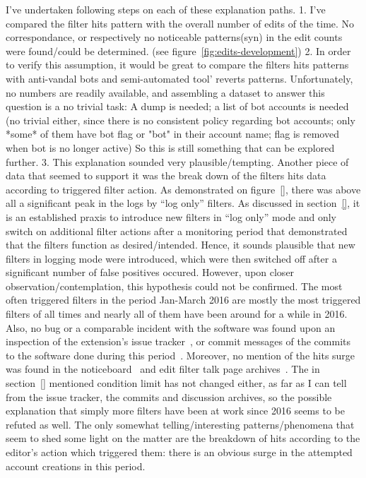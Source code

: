 I've undertaken following steps on each of these explanation paths.
1. I've compared the filter hits pattern with the overall number of edits of the time. No correspondance, or respectively no noticeable patterns(syn) in the edit counts were found/could be determined. (see figure~\ref{fig:edits-development})
2. In order to verify this assumption, it would be great to compare the filters hits patterns with anti-vandal bots and semi-automated tool' reverts patterns.
Unfortunately, no numbers are readily available, and assembling a dataset to answer this question is a no trivial task:
A dump is needed; a list of bot accounts is needed (no trivial either, since there is no consistent policy regarding bot accounts; only *some* of them have bot flag or "bot" in their account name; flag is removed when bot is no longer active) %
So this is still something that can be explored further.
3. This explanation sounded very plausible/tempting.
Another piece of data that seemed to support it was the break down of the filters hits data according to triggered filter action.
As demonstrated on figure~\ref{}, there was above all a significant peak in the logs by ``log only'' filters.
As discussed in section~\ref{}, it is an established praxis to introduce new filters in ``log only'' mode and only switch on additional filter actions after a monitoring period that demonstrated that the filters function as desired/intended.
Hence, it sounds plausible that new filters in logging mode were introduced, which were then switched off after a significant number of false positives occured.
However, upon closer observation/contemplation, this hypothesis could not be confirmed.
The most often triggered filters in the period Jan-March 2016 are mostly the most triggered filters of all times and nearly all of them have been around for a while in 2016.
Also, no bug or a comparable incident with the software was found upon an inspection of the extension's issue tracker~\cite{}, or commit messages of the commits to the software done during this period~\cite{gerrit}.
Moreover, no mention of the hits surge was found in the noticeboard~\cite{} and edit filter talk page archives~\cite{}.
The in section~\ref{} mentioned condition limit has not changed either, as far as I can tell from the issue tracker, the commits and discussion archives, so the possible explanation that simply more filters have been at work since 2016 seems to be refuted as well.
The only somewhat telling/interesting patterns/phenomena that seem to shed some light on the matter are the breakdown of hits according to the editor's action which triggered them: there is an obvious surge in the attempted account creations in this period.
